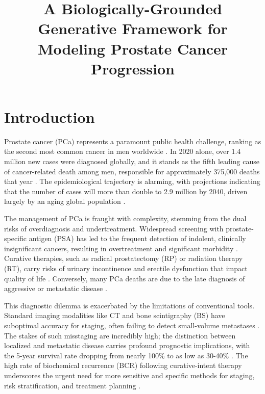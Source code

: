 \documentclass[11pt, a4paper]{article}
\title{A Biologically-Grounded Generative Framework for Modeling Prostate Cancer Progression}
\author{}
\date{}
\begin{document}
\maketitle

\section{Introduction}
Prostate cancer (PCa) represents a paramount public health challenge, ranking as the second most common cancer in men worldwide \cite{CaraccioloCastello2024,DulleaOSullivan2025}. In 2020 alone, over 1.4 million new cases were diagnosed globally, and it stands as the fifth leading cause of cancer-related death among men, responsible for approximately 375,000 deaths that year \cite{CereserEvangelista2023,GammelSolari2024,DharCendejasGomez2024}. The epidemiological trajectory is alarming, with projections indicating that the number of cases will more than double to 2.9 million by 2040, driven largely by an aging global population \cite{UdovicichJia2025,SungFerlay2021}.

The management of PCa is fraught with complexity, stemming from the dual risks of overdiagnosis and undertreatment. Widespread screening with prostate-specific antigen (PSA) has led to the frequent detection of indolent, clinically insignificant cancers, resulting in overtreatment and significant morbidity \cite{PadhaniSchoots2023,JenaTaneja2018,CaraccioloCastello2022}. Curative therapies, such as radical prostatectomy (RP) or radiation therapy (RT), carry risks of urinary incontinence and erectile dysfunction that impact quality of life \cite{GeboersMeijer2023,GiorgioRapa2024}. Conversely, many PCa deaths are due to the late diagnosis of aggressive or metastatic disease \cite{PadhaniSchoots2023}.

This diagnostic dilemma is exacerbated by the limitations of conventional tools. Standard imaging modalities like CT and bone scintigraphy (BS) have suboptimal accuracy for staging, often failing to detect small-volume metastases \cite{EsenSeymen2023,GiovacchiniPicchio2014,LingJong2021}. The stakes of such misstaging are incredibly high; the distinction between localized and metastatic disease carries profound prognostic implications, with the 5-year survival rate dropping from nearly 100\% to as low as 30-40\% \cite{WangODwyer2024,CereserEvangelista2023}. The high rate of biochemical recurrence (BCR) following curative-intent therapy underscores the urgent need for more sensitive and specific methods for staging, risk stratification, and treatment planning \cite{JinCai2024,CombesPalma2022}.
\end{document}
